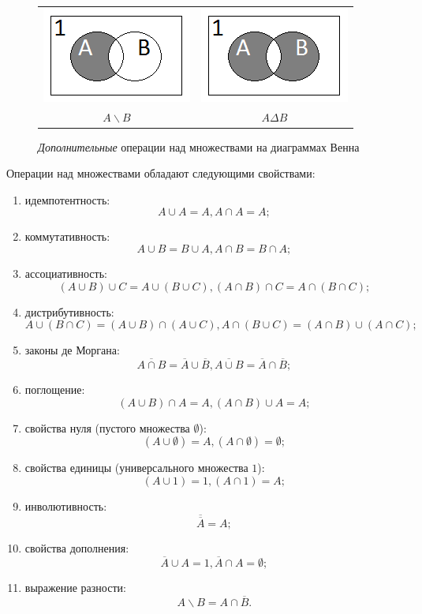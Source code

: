 \begin{figure}
    \centering
    \begin{tabular}{||c||c||}
        \hline\hline
        \includegraphics[width=.2\textwidth]{fig/ABsetSub}
            & \includegraphics[width=.2\textwidth]{fig/ABsetSymSub}\\
        $A\backslash B$ 
            & $A\Delta B$\\
        \hline\hline
    \end{tabular}
    \caption{\emph{Дополнительные} операции над множествами на диаграммах Венна}
    \label{fig:slaveSetOperations}
\end{figure}

Операции над множествами обладают следующими свойствами:
\begin{enumerate}
    \item идемпотентность:
    \[A\cup A=A,A\cap A=A;\]
    
    \item коммутативность:
    \[A\cup B=B\cup A,A\cap B=B\cap A;\]
    
    \item ассоциативность:
    \[(A\cup B)\cup C=A\cup(B\cup C),(A\cap B)\cap C=A\cap(B\cap C);\]
    
    \item дистрибутивность:
    \[A\cup(B\cap C)=(A\cup B)\cap(A\cup C),A\cap(B\cup C)=(A\cap B)\cup(A\cap C);\]
    
    \item законы де Моргана:
    \[
        \overline{A\cap B}=\overline{A}\cup\overline{B},
        \overline{A\cup B}=\overline{A}\cap\overline{B};
    \]
    
    \item поглощение:
    \[(A\cup B)\cap A=A,(A\cap B)\cup A=A;\]
    
    \item свойства нуля (пустого множества $\emptyset$):
    \[(A\cup \emptyset)=A,(A\cap \emptyset)=\emptyset;\]
    
    \item свойства единицы (универсального множества $1$):
    \[(A\cup 1)=1,(A\cap 1)=A;\]
    
    \item инволютивность:
    \[\overline{\overline{A}}=A;\]
        
    \item свойства дополнения:
    \[
        \overline{A}\cup A=1,
        \overline{A}\cap A=\emptyset;
    \]
    
    \item выражение разности:
    \[
        A\backslash B=A\cap\overline{B}.
    \]
\end{enumerate}

